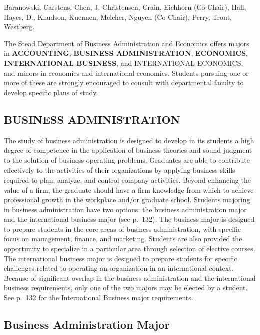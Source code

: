 \documentclass[
  letterpaper,
]{scrbook}
\begin{document}
Baranowski, Carstens, Chen, J. Christensen, Crain, Eichhorn (Co-Chair),
Hall, Hayes, D., Knudson, Kuennen, Melcher, Nguyen (Co-Chair), Perry,
Trout, Westberg.

The Stead Department of Business Administration and Economics offers
majors in \textbf{ACCOUNTING}, \textbf{BUSINESS ADMINISTRATION},
\textbf{ECONOMICS}, \textbf{INTERNATIONAL BUSINESS}, and INTERNATIONAL
ECONOMICS, and minors in economics and international economics. Students
pursuing one or more of these are strongly encouraged to consult with
departmental faculty to develop specific plans of study.

\subsection{BUSINESS ADMINISTRATION}\label{business-administration}

The study of business administration is designed to develop in its
students a high degree of competence in the application of business
theories and sound judgment to the solution of business operating
problems. Graduates are able to contribute effectively to the activities
of their organizations by applying business skills required to plan,
analyze, and control company activities. Beyond enhancing the value of a
firm, the graduate should have a firm knowledge from which to achieve
professional growth in the workplace and/or graduate school. Students
majoring in business administration have two options: the business
administration major and the international business major (see p.~132).
The business major is designed to prepare students in the core areas of
business administration, with specific focus on management, finance, and
marketing. Students are also provided the opportunity to specialize in a
particular area through selection of elective courses. The international
business major is designed to prepare students for specific challenges
related to operating an organization in an international context.\\
Because of significant overlap in the business administration and the
international business requirements, only one of the two majors may be
elected by a student. See p.~132 for the International Business major
requirements.

\subsection{Business Administration
Major}\label{business-administration-major}
\end{document}
